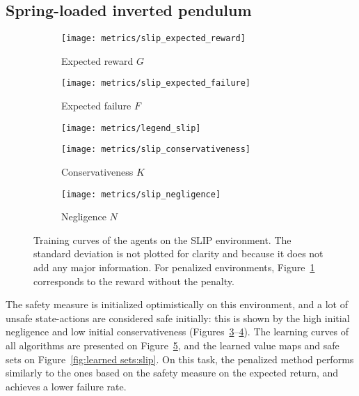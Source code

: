 \subsection{Spring-loaded inverted pendulum}

\begin{figure}[t]
	\centering
	\begin{subfigure}{0.39\textwidth}
		\centering
		\texttt{[image: metrics/slip\_expected\_reward]}
		\caption{Expected reward $G$}
		\label{fig:results:slip:expected reward}
	\end{subfigure}
	\begin{subfigure}{0.39\textwidth}
		\centering
		\texttt{[image: metrics/slip\_expected\_failure]}
		\caption{Expected failure $F$}
		\label{fig:results:slip:expected failure}
	\end{subfigure}
	\begin{subfigure}{0.2\textwidth}
		\centering
		\texttt{[image: metrics/legend\_slip]}
	\end{subfigure}
	\newline
	\begin{subfigure}{0.39\textwidth}
		\centering
		\texttt{[image: metrics/slip\_conservativeness]}
		\caption{Conservativeness $K$}
		\label{fig:results:slip:conservativeness}
	\end{subfigure}
	\begin{subfigure}{0.39\textwidth}
		\centering
		\texttt{[image: metrics/slip\_negligence]}
		\caption{Negligence $N$}
		\label{fig:results:slip:negligence}
	\end{subfigure}
	\begin{subfigure}{0.2\textwidth}
		\hfill
	\end{subfigure}
	\caption{Training curves of the agents on the SLIP environment. The standard deviation is not plotted for clarity and because it does not add any major information. For penalized environments, Figure~\ref{fig:results:slip:expected reward} corresponds to the reward without the penalty.}
	\label{fig:results:slip}
\end{figure}

The safety measure is initialized optimistically on this environment, and a lot of unsafe state-actions are considered safe initially: this is shown by the high initial negligence and low initial conservativeness (Figures~\ref{fig:results:slip:conservativeness}--\ref{fig:results:slip:negligence}). The learning curves of all algorithms are presented on Figure~\ref{fig:results:slip}, and the learned value maps and safe sets on Figure~\ref{fig:learned sets:slip}. On this task, the penalized method performs similarly to the ones based on the safety measure on the expected return, and achieves a lower failure rate. 

